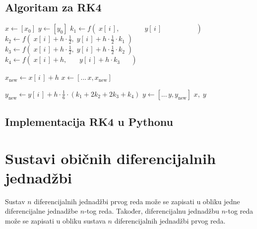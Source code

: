\begin{multicols}{2}
    
\subsection{Algoritam za RK4}

\begingroup
\makeatletter
\@totalleftmargin=-0.5cm
\begin{algorithmic}
        \State $x \gets [x_0]$
        \State $y \gets [y_0]$
        \For{$i \in [0, n\rangle$}
            \State $k_1 \gets f(\;x[\,i\,], \phantom{\ \,+ h \cdot \frac{1}{2}} \;y[\,i\,] \phantom{\ + h \cdot \frac{1}{2}\cdot k_1}\;)$
            \State $k_2 \gets f(\;x[\,i\,] + h \cdot \frac{1}{2},               \;y[\,i\,] + h \cdot \frac{1}{2}\cdot k_1\;)$
            \State $k_3 \gets f(\;x[\,i\,] + h \cdot \frac{1}{2},               \;y[\,i\,] + h \cdot \frac{1}{2}\cdot k_2\;)$
            \State $k_4 \gets f(\;x[\,i\,] + h, \phantom{\ \,\cdot \frac{1}{2}} \;y[\,i\,] + h \cdot k_3 \phantom{\ \frac{1}{2}\cdot}\;)$
            
            \State $x_{\text{new}} \gets x[\,i\,] + h$
            \State $x \gets [...\,x, x_{\text{new}}]$
            
            \State $y_{\text{new}} \gets y[\,i\,] + h \cdot \frac{1}{6} \cdot (k_1 + 2k_2 + 2k_3 + k_4)$
            \State $y \gets [...\,y, y_{\text{new}}]$
        \EndFor
        \State \Return $x,\;y$
    \EndFunction
\end{algorithmic}
\endgroup

\columnbreak

\subsection{Implementacija RK4 u Pythonu}

\begingroup
\makeatletter
\@totalleftmargin=-1cm


\endgroup

\end{multicols}

\newpage

\section{Sustavi običnih diferencijalnih jednadžbi}

Sustav $n$ diferencijalnih jednadžbi prvog reda može se zapisati u obliku jedne
diferencijalne jednadžbe $n$-tog reda. Također, diferencijalnu jednadžbu $n$-tog
reda može se zapisati u obliku sustava $n$ diferencijalnih jednadžbi prvog reda.

